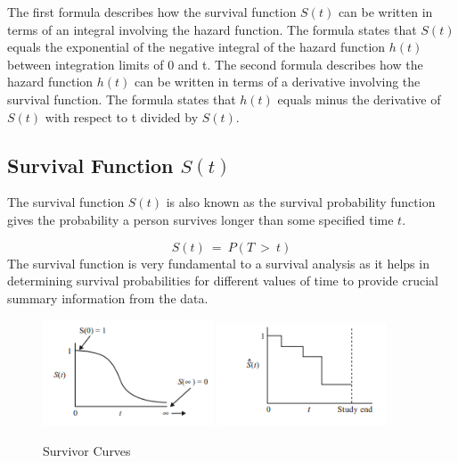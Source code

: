 \documentclass[doublespacing]{report} %
\begin{document}
The first formula describes how the survival function \(S\left(t\right)\) can be written in terms of an integral involving the hazard function. The formula states that \(S\left(t\right) \)equals the exponential of the negative integral of the hazard function \(h\left(t\right) \) between integration limits of 0 and t. 
The second formula describes how the hazard function \(h\left(t\right) \) can be written in terms of a derivative involving the survival function. The formula states that \( h\left(t\right)\) equals minus the derivative of \(S\left(t\right) \) with respect to t divided by \(S\left(t\right)\).


\subsection{\texorpdfstring{Survival Function \( S(t) \)}{Survival Function S(t)}}
The survival function \(S\left(t\right) \) is also known as the survival probability function gives the probability a person survives longer than some specified time \( t\).

\[S(t)\ =\ P(T\ >\ t)\]
The survival function is very fundamental to a survival analysis as it helps in determining survival probabilities for different values of time  to provide crucial summary information from the data.
\begin{figure}[H]
    \centering
    \includegraphics[width=0.45\textwidth]{Figure 3/3.31.png}
    \hfill
    \includegraphics[width=0.45\textwidth]{Figure 3/3.32.png}
    \caption{Survivor Curves}
    \label{Figure 3.3}
\end{figure}
\end{document}
